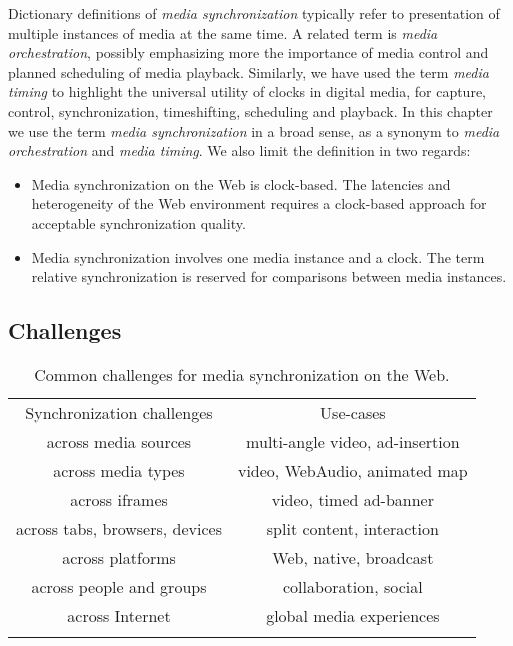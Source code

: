 Dictionary definitions of \emph{media synchronization} typically refer to
presentation of multiple instances of media at the same time. A related term
is \emph{media orchestration}, possibly emphasizing more the importance of
media control and planned scheduling of media playback. Similarly, we have
used the term \emph{media timing} to highlight the universal utility of clocks
in digital media, for capture, control, synchronization, timeshifting,
scheduling and playback. In this chapter we use the term \emph{media
synchronization} in a broad sense, as a synonym to \emph{media orchestration}
and \emph{media timing}. We also limit the definition in two regards:

\begin{itemize}
\item{Media synchronization on the Web is clock-based. The latencies and heterogeneity of the Web environment requires a clock-based approach for acceptable synchronization quality.}
\item{Media synchronization involves one media instance and a clock. The term relative synchronization is reserved for comparisons between media instances.}
\end{itemize}

\subsection{Challenges}


\begin{table}
\centering
\caption{Common challenges for media synchronization on the Web.}
\label{tab:challenges}
\setlength{\tabcolsep}{10pt}
\begin{tabular}{cc}
\hline\noalign{\smallskip}
Synchronization challenges & Use-cases \\
\noalign{\smallskip}\svhline\noalign{\smallskip}
across media sources & multi-angle video, ad-insertion \\
across media types & video, WebAudio, animated map \\
across iframes & video, timed ad-banner \\
across tabs, browsers, devices & split content, interaction \\
across platforms & Web, native, broadcast \\
across people and groups & collaboration, social \\
across Internet & global media experiences \\
\noalign{\smallskip}\hline\noalign{\smallskip}
\end{tabular}
\end{table} 



